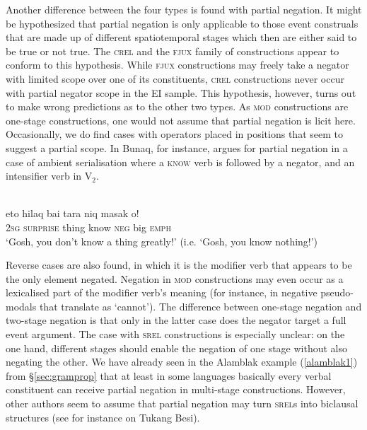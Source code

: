 Another difference between the four types is found with partial negation. It might be hypothesized that partial negation is only applicable to those event construals that are made up of different spatiotemporal stages which then are either said to be true or not true. The \textsc{crel} and the \textsc{fjux} family of constructions appear to conform to this hypothesis. While \textsc{fjux} constructions may freely take a negator with limited scope over one of its constituents, \textsc{crel} constructions never occur with partial negator scope in the EI sample. This hypothesis, however, turns out to make wrong predictions as to the other two types. As \textsc{mod} constructions are one-stage constructions, one would not assume that partial negation is licit here. Occasionally, we do find cases with operators placed in positions that seem to suggest a partial scope. In Bunaq, for instance, \citet[451]{schapper2009bunaq} argues for partial negation in a case of ambient serialisation where a \textsc{know} verb is followed by a negator, and an intensifier verb in V$_2$.

\ea 
{}\\
\gll eto hilaq bai tara niq masak o! \\
2\textsc{sg} \textsc{surprise} thing know \textsc{neg} big \textsc{emph} \\
\glft `Gosh, you don’t know a thing greatly!' (i.e. `Gosh, you know nothing!')\\ 
\z

Reverse cases are also found, in which it is the modifier verb that appears to be the only element negated. Negation in \textsc{mod} constructions may even occur as a lexicalised part of the modifier verb's meaning (for instance, in negative pseudo-modals that translate as `cannot'). The difference between one-stage negation and two-stage negation is that only in the latter case does the negator target a full event argument. The case with \textsc{srel} constructions is especially unclear: on the one hand, different stages should enable the negation of one stage without also negating the other. We have already seen in the Alamblak example (\ref{alamblak1}) from §\ref{sec:gramprop} that at least in some languages basically every verbal constituent can receive partial negation in multi-stage constructions. However, other authors seem to assume that partial negation may turn \textsc{srel}s into biclausal structures (see for instance \citealt[184]{donohue1999} on Tukang Besi). 

